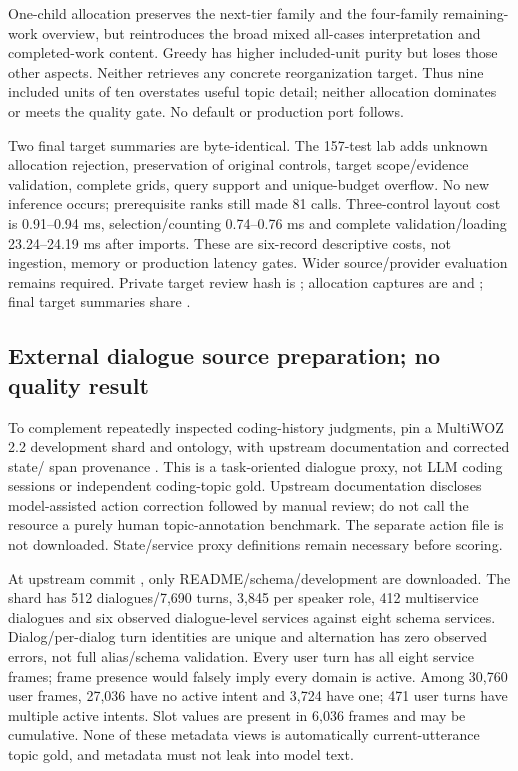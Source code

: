 \documentclass[11pt]{article}
\begin{document}
One-child allocation preserves the next-tier family and the four-family
remaining-work overview, but reintroduces the broad mixed all-cases interpretation
and completed-work content. Greedy has higher included-unit purity but loses those
other aspects. Neither retrieves any concrete reorganization target. Thus nine
included units of ten overstates useful topic detail; neither allocation dominates
or meets the quality gate. No default or production port follows.

Two final target summaries are byte-identical. The 157-test lab adds unknown
allocation rejection, preservation of original controls, target scope/evidence
validation, complete grids, query support and unique-budget overflow. No new
inference occurs; prerequisite ranks still made 81 calls. Three-control layout
cost is 0.91--0.94 ms, selection/counting 0.74--0.76 ms and complete validation/loading
23.24--24.19 ms after imports. These are six-record descriptive costs, not ingestion,
memory or production latency gates. Wider source/provider evaluation remains required.
Private target review hash is
;
allocation captures are
and ;
final target summaries share
.

\subsection{External dialogue source preparation; no quality result}
To complement repeatedly inspected coding-history judgments, pin a MultiWOZ 2.2
development shard and ontology, with upstream documentation and corrected state/
span provenance \cite{multiwoz22,multiwoz22data}. This is a task-oriented dialogue
proxy, not LLM coding sessions or independent coding-topic gold. Upstream documentation
discloses model-assisted action correction followed by manual review; do not call
the resource a purely human topic-annotation benchmark. The separate action file
is not downloaded. State/service proxy definitions remain necessary before scoring.

At upstream commit
, only README/schema/development
 are downloaded. The shard has 512 dialogues/7,690 turns,
3,845 per speaker role, 412 multiservice dialogues and six observed dialogue-level
services against eight schema services. Dialog/per-dialog turn identities are
unique and alternation has zero observed errors, not full alias/schema validation.
Every user turn has all eight service frames; frame presence would falsely imply
every domain is active. Among 30,760 user frames, 27,036 have no active intent and
3,724 have one; 471 user turns have multiple active intents. Slot values are present
in 6,036 frames and may be cumulative. None of these metadata views is automatically
current-utterance topic gold, and metadata must not leak into model text.
\end{document}
